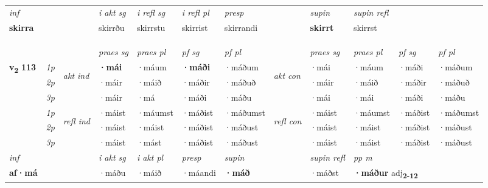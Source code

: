 \begin{longtable}[l]{X>{\footnotesize\itshape}llXXXXlXXXX}
   {\textit{inf}} & &  & \textit{i akt sg}  & \textit{i refl sg} & \textit{i refl pl} & \textit{presp} && \textit{supin} & \textit{supin refl}  \\*
  {\textbf{skirra}} & && skirrðu   & skirrstu & skirrist & skirrandi &&  \textbf{skirrt} & skirrst  \\*

\midrule
 & \\*
   & \\*
  & \\
   \midrule
 & &   & \textit{praes sg}  & \textit{praes pl}    & \textit{ pf sg} & \textit{pf pl} & & \textit{praes sg}  & \textit{praes pl}    & \textit{pf sg} & \textit{pf pl }  \\ \cmidrule{4-7} \cmidrule{9-12}
 \multirow{2}{*}{{{\textbf{v{\textsubscript{2}}} \Large{\textbf{113}}}}}  & 1p & \multirow{3}{*}{\begin{turn}{90}\textit{akt ind}\end{turn}} & \textbf{·mái} & ·máum & \textbf{·máði} & ·máðum & \multirow{3}{*}{\begin{turn}{90}\textit{akt con}\end{turn}} &·mái & ·máum & ·máði & ·máðum\\*
 & 2p &  &  ·máir  & ·máið & ·máðir & ·máðuð & & ·máir & ·máið & ·máðir & ·máðuð \\*
 & 3p &  & ·máir & ·má & ·máði & ·máðu & & ·mái & ·mái& ·máði & ·máðu \\*
\cmidrule{4-7} \cmidrule{9-12}
 & 1p & \multirow{3}{*}{\begin{turn}{90}\textit{refl ind}\end{turn}}  & ·máist & ·máumst & ·máðist & ·máðumst & \multirow{3}{*}{\begin{turn}{90}\textit{refl con}\end{turn}}  &·máist & ·máumst & ·máðist & ·máðumst \\*
 & 2p &  & ·máist & ·máist & ·máðist & ·máðust & &·máist & ·máist & ·máðist & ·máðust \\*
 & 3p  & & ·máist & ·mást & ·máðist & ·máðust & & ·máist & ·máist& ·máðist & ·máðust \\*
\cmidrule{4-7} \cmidrule{9-12}

   {\textit{inf}} & &  & \textit{i akt sg} & \textit{i akt pl}   & \textit{presp} & \textit{supin} && \textit{supin refl} & \textit{pp m} \\*
  {\textbf{af\allowbreak ·má}} & && ·máðu  & ·máið   & ·máandi &  \textbf{·máð} && ·máðst & \multicolumn{2}{l}{\textbf{·máður} adj\textbf{\textsubscript{2-12}}} \\*


\end{longtable}
